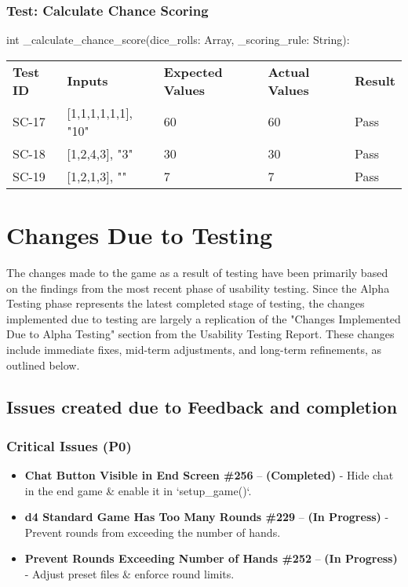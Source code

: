 \documentclass[12pt, titlepage]{article}
\begin{document}
\subsubsection{Test: Calculate Chance Scoring}
int \_calculate\_chance\_score(dice\_rolls: Array, \_scoring\_rule: String):\\
\begin{tabularx}{\textwidth}{|p{2cm}|p{3.5cm}|p{4cm}|p{4cm}|p{1.5cm}|}
    \cline{1-5}
    \textbf{Test ID} & \textbf{Inputs} & \textbf{Expected Values} & \textbf{Actual Values} & \textbf{Result} \\
    \cline{1-5}
    SC-17 & [1,1,1,1,1,1], "10" & 60 & 60 & Pass \\
    \cline{1-5}
    SC-18 & [1,2,4,3], "3" & 30 & 30 & Pass \\
    \cline{1-5}
    SC-19 & [1,2,1,3], "" & 7 & 7 & Pass \\
    \cline{1-5}
\end{tabularx}

\newpage
\section{Changes Due to Testing}

The changes made to the game as a result of testing have been primarily based on the findings from the most recent phase of usability testing. Since the Alpha Testing phase represents the latest completed stage of testing, the changes implemented due to testing are largely a replication of the "Changes Implemented Due to Alpha Testing" section from the Usability Testing Report. These changes include immediate fixes, mid-term adjustments, and long-term refinements, as outlined below.

\subsection{Issues created due to Feedback and completion}

\subsubsection{Critical Issues (P0)}
\begin{itemize}
    \item \textbf{Chat Button Visible in End Screen \#256} – \textbf{(Completed)} - Hide chat in the end game \& enable it in `setup\_game()`.
    \item \textbf{d4 Standard Game Has Too Many Rounds \#229} – \textbf{(In Progress)} - Prevent rounds from exceeding the number of hands.
    \item \textbf{Prevent Rounds Exceeding Number of Hands \#252} – \textbf{(In Progress)} - Adjust preset files \& enforce round limits.
\end{itemize}
\end{document}
